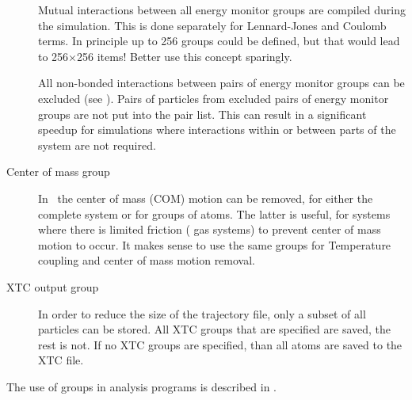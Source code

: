 {\begin{description}
\item[]
Mutual interactions between all energy monitor groups are compiled
during the simulation. This is done separately for Lennard-Jones and
Coulomb terms.  In principle up to 256 groups could be defined, but
that would lead to 256$\times$256 items! Better use this concept
sparingly.

All non-bonded interactions between pairs of energy monitor groups can
be excluded (see ).
Pairs of particles from excluded pairs of energy monitor groups
are not put into the pair list.
This can result in a significant speedup
for simulations where interactions within or between parts of the system
are not required.

\item[Center of mass group]
In \gromacs\ the center of mass (COM) motion can be removed, for
either the complete system or for groups of atoms. The latter is
useful, {\eg} for systems where there is limited friction ({\eg} gas
systems) to prevent center of mass motion to occur. It makes sense to
use the same groups for Temperature coupling and center of mass motion
removal.

\item[XTC output group]
In order to reduce the size of the  trajectory file, only a subset
of all particles can be stored. All XTC groups that are specified
are saved, the rest is not. If no XTC groups are specified, than all
atoms are saved to the XTC file.

\end{description}
The use of groups in analysis programs is described in
.
} %

